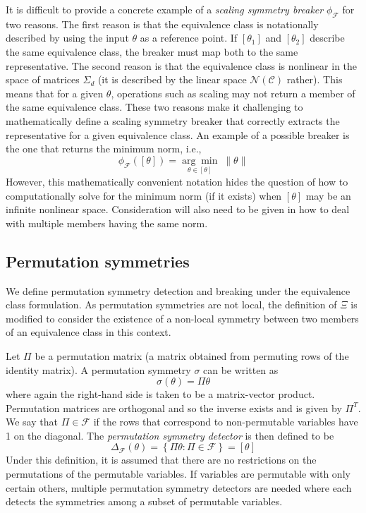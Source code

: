 It is difficult to provide a concrete example of a \textit{scaling symmetry breaker} $\phi_\mathcal{F}$ for two reasons. The first reason is that the equivalence class is notationally described by using the input $\theta$ as a reference point. If $[\theta_1]$ and $[\theta_2]$ describe the same equivalence class, the breaker must map both to the same representative. The second reason is that the equivalence class is nonlinear in the space of matrices $\Sigma_d$ (it is described by the linear space $\mathcal{N}(\mathcal{C})$ rather). This means that for a given $\theta$, operations such as scaling may not return a member of the same equivalence class. These two reasons make it challenging to mathematically define a scaling symmetry breaker that correctly extracts the representative for a given equivalence class. An example of a possible breaker is the one that returns the minimum norm, i.e.,
\[
\phi_\mathcal{F}([\theta]) = \underset{\theta\in[\theta]}{\arg\min}\;\|\theta\|
\]
However, this mathematically convenient notation hides the question of how to computationally solve for the minimum norm (if it exists) when $[\theta]$ may be an infinite nonlinear space. Consideration will also need to be given in how to deal with multiple members having the same norm.


\subsection{Permutation symmetries}

We define permutation symmetry detection and breaking under the equivalence class formulation. As permutation symmetries are not local, the definition of $\Xi$ is modified to consider the existence of a non-local symmetry between two members of an equivalence class in this context.

\begin{defn}
Let $\Pi$ be a permutation matrix (a matrix obtained from permuting rows of the identity matrix). A permutation symmetry $\sigma$ can be written as
\[
\sigma(\theta)=\Pi\theta
\]
where again the right-hand side is taken to be a matrix-vector product. Permutation matrices are orthogonal and so the inverse exists and is given by $\Pi^T$. We say that $\Pi\in\mathcal{F}$ if the rows that correspond to non-permutable variables have 1 on the diagonal. The \textit{permutation symmetry detector} is then defined to be
\[
\Delta_\mathcal{F}(\theta) = \left\{\Pi\theta:\Pi\in\mathcal{F}\right\} = [\theta]
\]
Under this definition, it is assumed that there are no restrictions on the permutations of the permutable variables. If variables are permutable with only certain others, multiple permutation symmetry detectors are needed where each detects the symmetries among a subset of permutable variables.
\end{defn}

